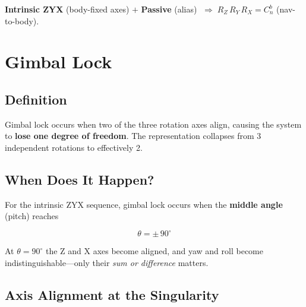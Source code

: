 \documentclass[12pt,a4paper]{article}
\begin{document}
\begin{keybox}
\textbf{Intrinsic ZYX} (body-fixed axes) $+$ \textbf{Passive} (alias)
$\;\Longrightarrow\; R_Z\,R_Y\,R_X = C_n^b$ (nav-to-body).
\end{keybox}

\section{Gimbal Lock}

\subsection{Definition}

Gimbal lock occurs when two of the three rotation axes align, causing the
system to \textbf{lose one degree of freedom}. The representation collapses
from 3 independent rotations to effectively 2.

\subsection{When Does It Happen?}

For the intrinsic ZYX sequence, gimbal lock occurs when the \textbf{middle
angle} (pitch) reaches

\begin{equation}
  \theta = \pm\,90^\circ
\end{equation}

At $\theta = 90^\circ$ the Z and X axes become aligned, and yaw and roll
become indistinguishable---only their \emph{sum or difference} matters.

\subsection{Axis Alignment at the Singularity}
\end{document}
